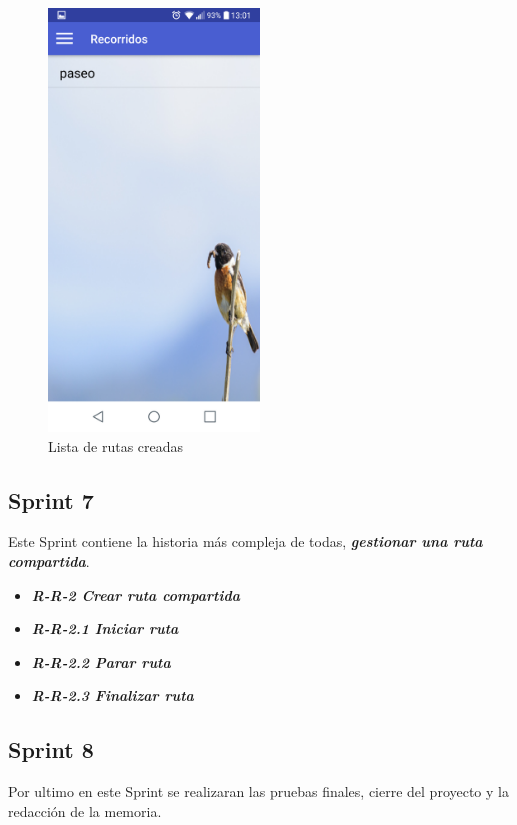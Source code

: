 \begin{figure}[htbp]
		\centering
		\includegraphics[width=0.5\textwidth] {capturamovil/listarutas}
		\caption{Lista de rutas creadas}
	\end{figure}
\newpage
\subsection{Sprint 7}
Este Sprint contiene la historia más compleja de todas,\textbf{ \textit{gestionar una ruta compartida}}.

\begin{itemize}
\item \textbf{\textit{R-R-2 Crear ruta compartida}}
\item \textbf{\textit{R-R-2.1 Iniciar ruta}}
\item \textbf{\textit{R-R-2.2 Parar ruta}}
\item \textbf{\textit{R-R-2.3 Finalizar ruta}}
\end{itemize}

\subsection{Sprint 8}

Por ultimo en este Sprint se realizaran las pruebas finales, cierre del proyecto y la redacción de la memoria.

